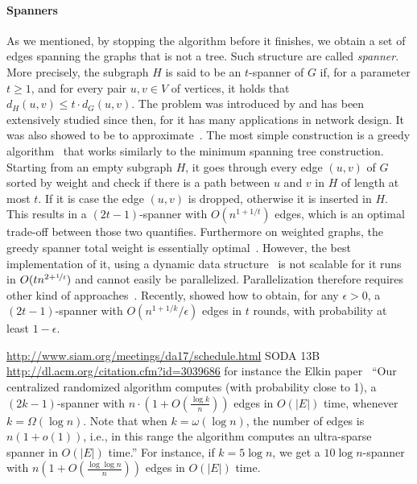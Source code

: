 \paragraph{Spanners}
\label{par:spanners}

As we mentioned, by stopping the \gtx{} algorithm before it finishes, we obtain a set of edges
spanning the graphs that is not a tree. Such structure are called \emph{spanner}. More precisely,
the subgraph $H$ is said to be an $t$-spanner of $G$ if, for a parameter $t \geq 1$, and for every
pair $u, v \in V$ of vertices, it holds that $d_H(u, v) \leq t \cdot d_G(u, v)$. The problem was
introduced by \textcites{SpannerFirst89}{SpannerSecond89} and has been extensively studied since
then, for it has many applications in network design. It was also showed to be \NPh{} to
approximate~\autocite{SpannerNPHard07}. The most simple construction is a greedy
algorithm~\autocite{greedySpanner93} that works similarly to the minimum spanning tree construction.
Starting from an empty subgraph $H$, it goes through every edge $(u, v)$ of $G$ sorted by weight and
check if there is a path between $u$ and $v$ in $H$ of length at most $t$. If it is case the edge
$(u,v)$ is dropped, otherwise it is inserted in $H$. This results in a $(2t - 1)$-spanner with
$O(n^{1+1/t})$ edges, which is an optimal trade-off between those two quantifies.  Furthermore on
weighted graphs, the greedy spanner total weight is essentially optimal~\autocite{GreedyOpt16}.
However, the best implementation of it, using a dynamic data structure~\autocite{fastGreedy04} is
not scalable for it runs in $O(t n^{2+\nicefrac{1}{t}})$ and cannot easily be parallelized.
Parallelization therefore requires other kind of approaches~\autocites{parSpanner08}{parSpanner15}.
Recently, \textcite{Spanner17} showed how to obtain, for any $\epsilon > 0$, a $(2t - 1)$-spanner
with $O(n^{1+1/k}/\epsilon)$ edges in $t$ rounds, with probability at least $1 - \epsilon$.

\iffalse
\url{http://www.siam.org/meetings/da17/schedule.html} SODA 13B \url{http://dl.acm.org/citation.cfm?id=3039686}
for instance the Elkin paper~\autocite{Spanner17} \enquote{Our centralized randomized algorithm computes (with
probability close to 1), a $(2k - 1)$-spanner with $n \cdot (1 + O(\frac{\log k}{n}))$ edges in
$O(|E|)$ time, whenever $k = \Omega(\log n)$. Note that when $k = \omega(\log n)$, the number of
edges is $n(1+o(1))$, i.e., in this range the algorithm computes an ultra-sparse spanner in $O(|E|)$
time.} For instance, if $k=5\log n$, we get a $10\log n$-spanner with $n\left(1+O\left(\frac{\log\log
n}{n}\right)\right)$ edges in $O(|E|)$ time.


